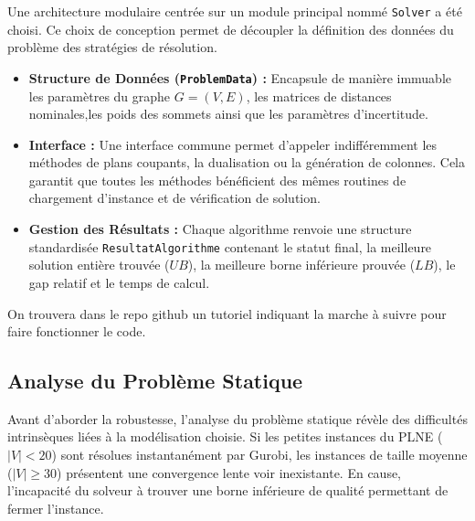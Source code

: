 \documentclass{article}
\begin{document}
 Une architecture modulaire centrée sur un module principal nommé \texttt{Solver} a été choisi. Ce choix de conception permet de découpler la définition des données du problème des stratégies de résolution.
\begin{itemize}
    \item \textbf{Structure de Données (\texttt{ProblemData}) :} Encapsule de manière immuable les paramètres du graphe $G=(V,E)$, les matrices de distances nominales,les poids des sommets ainsi que les paramètres d'incertitude.
    \item \textbf{Interface :} Une interface commune permet d'appeler indifféremment les méthodes de plans coupants, la dualisation ou la génération de colonnes. Cela garantit que toutes les méthodes bénéficient des mêmes routines de chargement d'instance et de vérification de solution.
    \item \textbf{Gestion des Résultats :} Chaque algorithme renvoie une structure standardisée \texttt{ResultatAlgorithme} contenant le statut final, la meilleure solution entière trouvée ($UB$), la meilleure borne inférieure prouvée ($LB$), le gap relatif et le temps de calcul.
\end{itemize}

On trouvera dans le repo github un tutoriel indiquant la marche à suivre pour faire fonctionner le code.

\subsection{Analyse du Problème Statique}

Avant d'aborder la robustesse, l'analyse du problème statique révèle des difficultés intrinsèques liées à la modélisation choisie.
Si les petites instances du PLNE ($|V| < 20$) sont résolues instantanément par Gurobi, les instances de taille moyenne ($|V| \ge 30$) présentent une convergence lente voir inexistante. En cause, l'incapacité du solveur à trouver une borne inférieure de qualité permettant de fermer l'instance.
\end{document}
